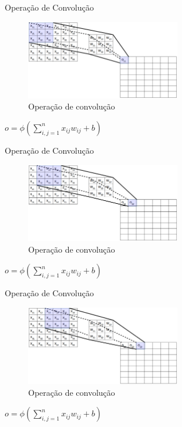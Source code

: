 \documentclass[%
  xcolor=table,%
  10pt,%
  aspectratio = 169,%
  compress,%
  t,%
]{beamer}%
\begin{document}
\begin{frame}{}{Operação de Convolução}
    \begin{center}
        \begin{figure}
            \centering
            \includegraphics[width=0.6\textwidth]{./Figuras/conv-op-1.png}
            \caption{Operação de convolução}
        \end{figure}
        $o = \phi(\sum_{i,j=1}^{n} x_{ij}w_{ij} + b)$
    \end{center}
\end{frame}

\begin{frame}{}{Operação de Convolução}
    \begin{center}
        \begin{figure}
            \centering
            \includegraphics[width=0.6\textwidth]{./Figuras/conv-op-2.png}
            \caption{Operação de convolução}
        \end{figure}
        $o = \phi(\sum_{i,j=1}^{n} x_{ij}w_{ij} + b)$
    \end{center}
\end{frame}

\begin{frame}{}{Operação de Convolução}
    \begin{center}
        \begin{figure}
            \centering
            \includegraphics[width=0.6\textwidth]{./Figuras/conv-op-3.png}
            \caption{Operação de convolução}
        \end{figure}
        $o = \phi(\sum_{i,j=1}^{n} x_{ij}w_{ij} + b)$
    \end{center}
\end{frame}
\end{document}
